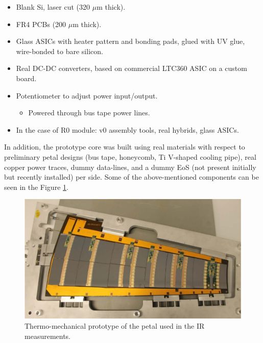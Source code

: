 		\begin{itemize}
			\renewcommand{\labelitemi}{$\diamond$}
			\item Blank Si, laser cut (320 $\mu$m thick).
			\item FR4 PCBs (200 $\mu$m thick).
			\item Glass ASICs with heater pattern and bonding pads, glued with UV glue, wire-bonded to bare silicon.
			\item Real DC-DC converters, based on commercial LTC360 ASIC on a custom board.
			\item Potentiometer to adjust power input/output.
			\begin{itemize}
			\renewcommand{\labelitemi}{$\bullet$}
				\item Powered through bus tape power lines.
			\end{itemize}
			\item In the case of R0 module: v0 assembly tools, real hybrids, glass ASICs.
		\end{itemize}
		
		In addition, the prototype core was built using real materials with respect to preliminary petal designs (bus tape, honeycomb, Ti V-shaped cooling pipe), real copper power traces, dummy data-lines, and a dummy EoS (not present initially but recently installed) per side. Some of the above-mentioned components can be seen in the Figure \ref{fig2.2}.
		
		\begin{figure}[ht!]
			\centering
			\captionsetup{justification=centering,margin=2cm}
			\includegraphics[scale=0.35]{Figures/Chapter02/PetalConstruction.jpg}
			\caption{Thermo-mechanical prototype of the petal  used in the IR measurements.}\label{fig2.2}
		\end{figure}\bigskip
		
